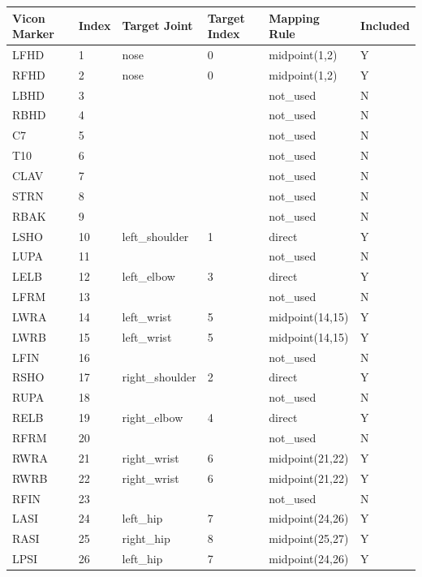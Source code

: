 \begin{table}[htbp]
\centering
\scriptsize
\begin{tabular}{|p{2.5cm}|p{1.5cm}|p{3.5cm}|p{2.0cm}|p{3.0cm}|p{1.5cm}|}
\hline
\textbf{Vicon Marker} & \textbf{Index} & \textbf{Target Joint} & \textbf{Target Index} & \textbf{Mapping Rule} & \textbf{Included} \\ \hline
LFHD & 1 & nose & 0 & midpoint(1,2) & Y \\ \hline
RFHD & 2 & nose & 0 & midpoint(1,2) & Y \\ \hline
LBHD & 3 &  &  & not\_used & N \\ \hline
RBHD & 4 &  &  & not\_used & N \\ \hline
C7 & 5 &  &  & not\_used & N \\ \hline
T10 & 6 &  &  & not\_used & N \\ \hline
CLAV & 7 &  &  & not\_used & N \\ \hline
STRN & 8 &  &  & not\_used & N \\ \hline
RBAK & 9 &  &  & not\_used & N \\ \hline
LSHO & 10 & left\_shoulder & 1 & direct & Y \\ \hline
LUPA & 11 &  &  & not\_used & N \\ \hline
LELB & 12 & left\_elbow & 3 & direct & Y \\ \hline
LFRM & 13 &  &  & not\_used & N \\ \hline
LWRA & 14 & left\_wrist & 5 & midpoint(14,15) & Y \\ \hline
LWRB & 15 & left\_wrist & 5 & midpoint(14,15) & Y \\ \hline
LFIN & 16 &  &  & not\_used & N \\ \hline
RSHO & 17 & right\_shoulder & 2 & direct & Y \\ \hline
RUPA & 18 &  &  & not\_used & N \\ \hline
RELB & 19 & right\_elbow & 4 & direct & Y \\ \hline
RFRM & 20 &  &  & not\_used & N \\ \hline
RWRA & 21 & right\_wrist & 6 & midpoint(21,22) & Y \\ \hline
RWRB & 22 & right\_wrist & 6 & midpoint(21,22) & Y \\ \hline
RFIN & 23 &  &  & not\_used & N \\ \hline
LASI & 24 & left\_hip & 7 & midpoint(24,26) & Y \\ \hline
RASI & 25 & right\_hip & 8 & midpoint(25,27) & Y \\ \hline
LPSI & 26 & left\_hip & 7 & midpoint(24,26) & Y \\ \hline

\end{tabular}
\end{table}
